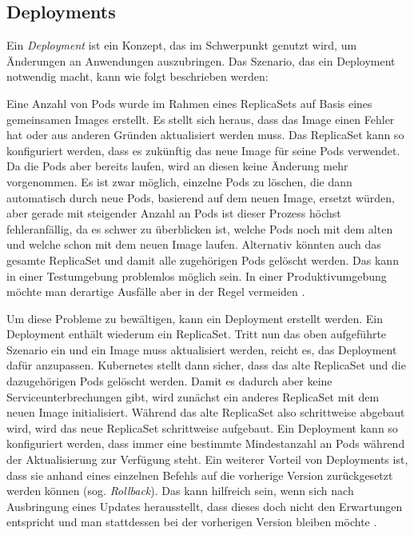 \documentclass[11pt,a4paper]{article}
\begin{document}
\subsection{Deployments}
Ein \emph{Deployment} ist ein Konzept, das im Schwerpunkt genutzt wird, um Änderungen an Anwendungen auszubringen.
Das Szenario, das ein Deployment notwendig macht, kann wie folgt beschrieben werden:

Eine Anzahl von Pods wurde im Rahmen eines ReplicaSets auf Basis eines gemeinsamen Images erstellt.
Es stellt sich heraus, dass das Image einen Fehler hat oder aus anderen Gründen aktualisiert werden muss.
Das ReplicaSet kann so konfiguriert werden, dass es zukünftig das neue Image für seine Pods verwendet.
Da die Pods aber bereits laufen, wird an diesen keine Änderung mehr vorgenommen. Es ist zwar möglich,
einzelne Pods zu löschen, die dann automatisch durch neue Pods, basierend auf dem neuen Image, ersetzt würden, aber
gerade mit steigender Anzahl an Pods ist dieser Prozess höchst
fehleranfällig, da es schwer zu überblicken ist, welche Pods noch mit dem alten und welche schon mit dem
neuen Image laufen. Alternativ könnten auch das gesamte ReplicaSet und damit alle zugehörigen Pods gelöscht werden.
Das kann in einer Testumgebung problemlos möglich sein. In einer Produktivumgebung möchte man derartige
Ausfälle aber in der Regel vermeiden \cite{Schmeling_Dargatz_2022}. %

Um diese Probleme zu bewältigen, kann ein Deployment erstellt werden.
Ein Deployment enthält wiederum ein ReplicaSet. Tritt nun das oben aufgeführte Szenario ein und ein Image
muss aktualisiert werden, reicht es, das Deployment dafür anzupassen.
Kubernetes stellt dann sicher, dass das alte ReplicaSet und die dazugehörigen Pods gelöscht werden.
Damit es dadurch aber keine Serviceunterbrechungen gibt, wird zunächst ein anderes ReplicaSet mit dem neuen
Image initialisiert. Während das alte ReplicaSet also schrittweise abgebaut wird, wird das neue ReplicaSet
schrittweise aufgebaut. Ein Deployment kann so konfiguriert werden, dass immer eine bestimmte Mindestanzahl an
Pods während der Aktualisierung zur Verfügung steht.
Ein weiterer Vorteil von Deployments ist, dass sie anhand eines einzelnen Befehls auf die vorherige Version
zurückgesetzt werden können (sog. \emph{Rollback}). Das kann hilfreich sein, wenn sich nach Ausbringung eines
Updates herausstellt, dass dieses doch nicht den Erwartungen entspricht und man stattdessen bei der vorherigen
Version bleiben möchte \cite{Schmeling_Dargatz_2022}.
\end{document}
